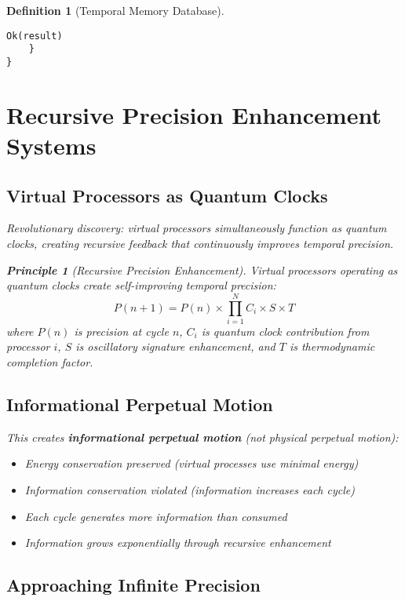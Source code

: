 \documentclass[12pt]{article}
\newtheorem{definition}[theorem]{Definition}
\newtheorem{principle}[theorem]{Principle}
\begin{document}
\begin{definition}[Temporal Memory Database]
\begin{lstlisting}[caption=Temporal Virtual Processor Implementation]
        Ok(result)
    }
}
\end{lstlisting}

\section{Recursive Precision Enhancement Systems}

\subsection{Virtual Processors as Quantum Clocks}

Revolutionary discovery: virtual processors simultaneously function as quantum clocks, creating recursive feedback that continuously improves temporal precision.

\begin{principle}[Recursive Precision Enhancement]
Virtual processors operating as quantum clocks create self-improving temporal precision:
\begin{equation}
P(n+1) = P(n) \times \prod_{i=1}^{N} C_i \times S \times T
\end{equation}
where $P(n)$ is precision at cycle $n$, $C_i$ is quantum clock contribution from processor $i$, $S$ is oscillatory signature enhancement, and $T$ is thermodynamic completion factor.
\end{principle}

\subsection{Informational Perpetual Motion}

This creates \textbf{informational perpetual motion} (not physical perpetual motion):
\begin{itemize}
    \item Energy conservation preserved (virtual processes use minimal energy)
    \item Information conservation violated (information increases each cycle)
    \item Each cycle generates more information than consumed
    \item Information grows exponentially through recursive enhancement
\end{itemize}

\subsection{Approaching Infinite Precision}


\end{definition}
\end{document}
